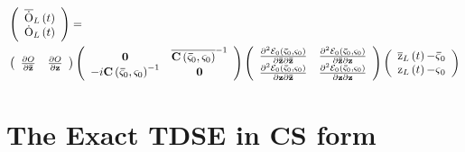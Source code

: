 \documentclass[aps,preprint]{revtex4}%
\begin{document}
\begin{align}
&  \left(
\begin{array}
[c]{c}%
\overline{\mathrm{\dot{O}}}_{L}\left(  t\right) \\
\mathrm{\dot{O}}_{L}\left(  t\right)
\end{array}
\right)  =\nonumber\\
&  \left(
\begin{array}
[c]{cc}%
\frac{\partial O}{\partial\mathbf{\bar{z}}} & \frac{\partial O}{\partial
\mathbf{z}}%
\end{array}
\right)  \left(
\begin{array}
[c]{cc}%
\mathbf{0} & \overline{\mathbf{C}\left(  \mathbf{\bar{\varsigma}}%
_{0},\mathbf{\varsigma}_{0}\right)  }^{-1}\\
-i\mathbf{C}\left(  \mathbf{\bar{\varsigma}}_{0},\mathbf{\varsigma}%
_{0}\right)  ^{-1} & \mathbf{0}%
\end{array}
\right)  \left(
\begin{array}
[c]{cc}%
\frac{\partial^{2}\mathcal{E}_{0}\left(  \mathbf{\bar{\varsigma}}%
_{0},\mathbf{\varsigma}_{0}\right)  }{\partial\mathbf{\bar{z}}\partial
\mathbf{\bar{z}}} & \frac{\partial^{2}\mathcal{E}_{0}\left(  \mathbf{\bar
{\varsigma}}_{0},\mathbf{\varsigma}_{0}\right)  }{\partial\mathbf{\bar{z}%
}\partial\mathbf{z}}\\
\frac{\partial^{2}\mathcal{E}_{0}\left(  \mathbf{\bar{\varsigma}}%
_{0},\mathbf{\varsigma}_{0}\right)  }{\partial\mathbf{z}\partial
\mathbf{\bar{z}}} & \frac{\partial^{2}\mathcal{E}_{0}\left(  \mathbf{\bar
{\varsigma}}_{0},\mathbf{\varsigma}_{0}\right)  }{\partial\mathbf{z}%
\partial\mathbf{z}}%
\end{array}
\right)  \left(
\begin{array}
[c]{c}%
\overline{\mathrm{z}}_{L}\left(  t\right)  \mathbf{-\bar{\varsigma}}_{0}\\
\mathrm{z}_{L}\left(  t\right)  \mathbf{-\varsigma}_{0}%
\end{array}
\right)
\end{align}


\section{The Exact TDSE in CS form\label{CSTDSE}}
\end{document}
